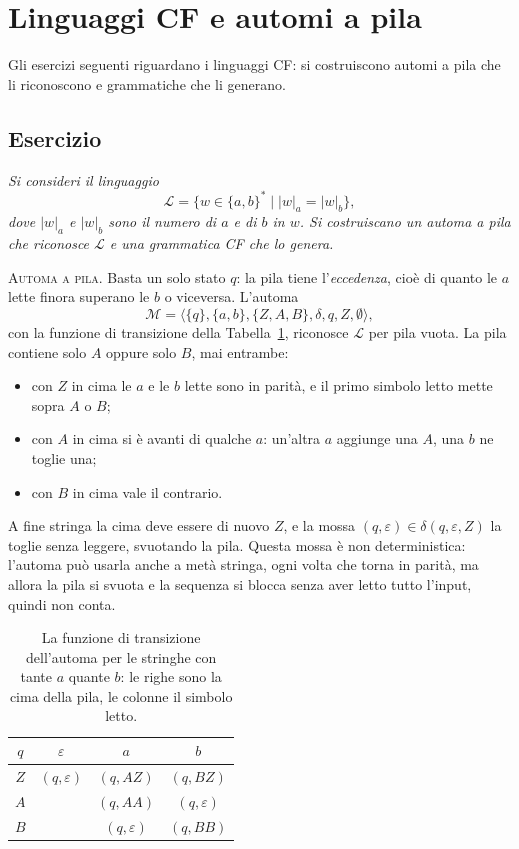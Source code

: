 \documentclass[a4paper, 11pt, oneside]{book}
\makeatletter
\theoremstyle{formale}
\newcommand{\spaziominimo}[1]{%
    \par
    \if@nobreak\else
        \ifdim\pagegoal<\maxdimen
            \ifdim\dimexpr\pagegoal-\pagetotal\relax<#1\relax
                \ifdim\pagetotal>\pagegoal\else
                    \newpage
                \fi
            \fi
        \fi
    \fi}
\newcounter{escount}[section]
\newcommand{\esercizio}{
    \spaziominimo{8\baselineskip}%
    \refstepcounter{escount}%
    \subsection*{Esercizio \arabic{escount}}%
}
\makeatother
\begin{document}
    \section{Linguaggi CF e automi a pila}
    Gli esercizi seguenti riguardano i linguaggi CF: si costruiscono automi a pila che li
    riconoscono e grammatiche che li generano.

    \esercizio
    \textit{Si consideri il linguaggio
    \begin{equation*}
        \mathcal{L} = \{w \in \{a, b\}^* \mid |w|_a = |w|_b\},
    \end{equation*}
    dove $|w|_a$ e $|w|_b$ sono il numero di $a$ e di $b$ in $w$. Si costruiscano un
    automa a pila che riconosce $\mathcal{L}$ e una grammatica CF che lo genera.}

    \textsc{Automa a pila}. Basta un solo stato $q$: la pila tiene
    l'\emph{eccedenza}, cio\`e di quanto le $a$ lette finora superano le $b$ o
    viceversa. L'automa
    \begin{equation*}
        \mathcal{M} = \langle \{q\}, \{a, b\}, \{Z, A, B\}, \delta, q, Z, \emptyset
        \rangle,
    \end{equation*}
    con la funzione di transizione della Tabella~\ref{tab:es-pila-ab}, riconosce
    $\mathcal{L}$ per pila vuota. La pila contiene solo $A$ oppure solo $B$, mai
    entrambe:
    \begin{itemize}
        \item con $Z$ in cima le $a$ e le $b$ lette sono in parit\`a, e il primo simbolo
            letto mette sopra $A$ o $B$;
        \item con $A$ in cima si \`e avanti di qualche $a$: un'altra $a$ aggiunge una $A$,
            una $b$ ne toglie una;
        \item con $B$ in cima vale il contrario.
    \end{itemize}
    A fine stringa la cima deve essere di nuovo $Z$, e la mossa
    $(q, \varepsilon) \in \delta(q, \varepsilon, Z)$ la toglie senza leggere, svuotando
    la pila. Questa mossa \`e non deterministica: l'automa pu\`o usarla anche a met\`a
    stringa, ogni volta che torna in parit\`a, ma allora la pila si svuota e la sequenza
    si blocca senza aver letto tutto l'input, quindi non conta.

    \begin{table}[H]
        \centering
        \begin{tabular}{cccc}
            \toprule
            $q$ & $\varepsilon$ & $a$ & $b$ \\
            \midrule
            $Z$ & $(q, \varepsilon)$ & $(q, AZ)$ & $(q, BZ)$ \\
            $A$ & & $(q, AA)$ & $(q, \varepsilon)$ \\
            $B$ & & $(q, \varepsilon)$ & $(q, BB)$ \\
            \bottomrule
        \end{tabular}
        \caption{La funzione di transizione dell'automa per le stringhe con tante $a$
            quante $b$: le righe sono la cima della pila, le colonne il simbolo letto.}
        \label{tab:es-pila-ab}
    \end{table}
\end{document}
